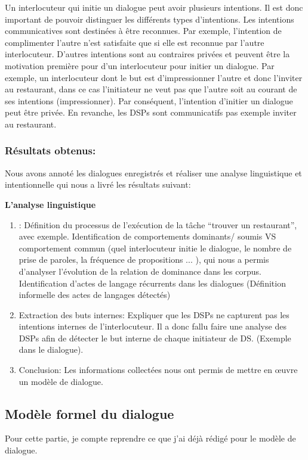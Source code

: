 \documentclass[a4paper,french]{article}
\begin{document}
\par Un interlocuteur qui initie un dialogue peut avoir plusieurs intentions. Il est donc important de pouvoir distinguer les différents types d'intentions. Les intentions communicatives sont destinées à être reconnues. Par exemple, l'intention de complimenter l'autre n'est satisfaite que si elle est reconnue par l'autre interlocuteur. D'autres intentions sont au contraires privées et peuvent être la motivation première pour d'un interlocuteur pour initier un dialogue. Par exemple, un interlocuteur dont le but est d’impressionner l'autre et donc l'inviter au restaurant, dans ce cas l'initiateur ne veut pas que l'autre soit au courant de ses intentions (impressionner). Par conséquent, l'intention d'initier un dialogue peut être privée. En revanche, les DSPs sont communicatifs pas exemple inviter au restaurant. 

\subsubsection{Résultats obtenus:}
\par Nous avons annoté les dialogues enregistrés et réaliser une analyse linguistique et intentionnelle qui nous a livré les résultats suivant: 

\textbf{L'analyse linguistique}
\begin{enumerate}
	\item  :
		\subitem Définition du processus de l’exécution de la tâche ``trouver un restaurant'', avec exemple. 
		\subitem Identification de comportements dominants/ soumis VS comportement commun (quel interlocuteur initie le dialogue, le nombre de prise de paroles, la fréquence de propositions ... ), qui nous a permis d'analyser l'évolution de la relation de dominance dans les corpus. 
		\subitem Identification d'actes de langage récurrents dans les dialogues (Définition informelle des actes de langages détectés)
	\item Extraction des buts internes: Expliquer que les DSPs ne capturent pas les intentions internes de l'interlocuteur. Il a donc fallu faire une analyse des DSPs afin de détecter le but interne de chaque initiateur de DS. (Exemple dans le dialogue).
	\item Conclusion: Les informations collectées nous ont permis de mettre en œuvre un modèle de dialogue. 
	
	
\end{enumerate}
\subsection{Modèle formel du dialogue}
\par Pour cette partie, je compte reprendre ce que j'ai déjà rédigé pour le modèle de dialogue. 
\end{document}
